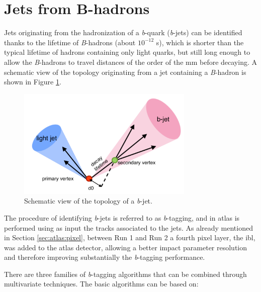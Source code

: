 \section{Jets from B-hadrons}
\label{sec:btagging}

Jets originating from the hadronization of a \textit{b}-quark (\textit{b}-jets) can be identified thanks to the lifetime of \textit{B}-hadrons (about $10^{-12}$ s), which is shorter than the typical lifetime of hadrons containing only light quarks, but still long enough to allow the \textit{B}-hadrons to travel distances of the order of the mm before decaying. A schematic view of the topology originating from a jet containing a \textit{B}-hadron is shown in Figure \ref{fig:btag}. 

\begin{figure}[h]
\begin{center}
\includegraphics[width=0.75\textwidth]{./figures/springer/bjets.pdf}
\end{center}
\caption[Schematic view of the topology of a \textit{b}-jet.]{Schematic view of the topology of a \textit{b}-jet.}
\label{fig:btag}
\end{figure}

The procedure of identifying \textit{b}-jets is referred to as \textit{b}-tagging, and in \gls{atlas} is performed using as input the tracks associated to the jets. As already mentioned in Section \ref{sec:atlas:pixel}, between Run 1 and Run 2 a fourth pixel layer, the \gls{ibl}, was added to the \gls{atlas} detector, allowing a better impact parameter resolution and therefore improving substantially the \textit{b}-tagging performance. 

There are three families of \textit{b}-tagging algorithms that can be combined through multivariate techniques. The basic algorithms can be based on:

